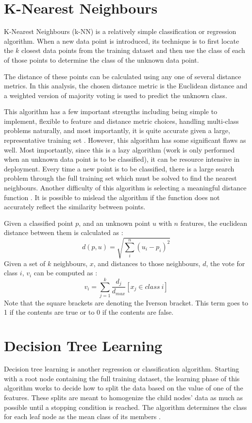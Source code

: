 \section{K-Nearest Neighbours}
K-Nearest Neighbours (k-NN) is a relatively simple classification or regression algorithm. When a new data point is introduced, its technique is to first locate the $k$ closest data points from the training dataset and then use the class of each of those points to determine the class of the unknown data point.

The distance of these points can be calculated using any one of several distance metrics. In this analysis, the chosen distance metric is the Euclidean distance and a weighted version of majority voting is used to predict the unknown class.

This algorithm has a few important strengths including being simple to implement, flexible to feature and distance metric choices, handling multi-class problems naturally, and most importantly, it is quite accurate given a large, representative training set \cite{KNN}. However, this algorithm has some significant flaws as well. Most importantly, since this is a lazy algorithm (work is only performed when an unknown data point is to be classified), it can be resource intensive in deployment. Every time a new point is to be classified, there is a large search problem through the full training set which must be solved to find the nearest neighbours. Another difficulty of this algorithm is selecting a meaningful distance function \cite{KNN}. It is possible to mislead the algorithm if the function does not accurately reflect the similarity between points.

Given a classified point $p$, and an unknown point $u$ with $n$ features, the euclidean distance between them is calculated as \cite{KNN}: 
$$d(p, u) = \sqrt{\sum\limits_i^n(u_i - p_i)^2}$$
Given a set of $k$ neighbours, $x$, and distances to those neighbours, $d$, the vote for class $i$, $v_i$ can be computed as \cite{KNN}:
$$v_i = \sum\limits_{j=1}^{k} \frac{d_j}{d_{max}} \left[x_j \in class~i\right]$$
Note that the square brackets are denoting the Iverson bracket. This term goes to 1 if the contents are true or to 0 if the contents are false.



\section{Decision Tree Learning}
Decision tree learning is another regression or classification algorithm. Starting with a root node containing the full training dataset, the learning phase of this algorithm works to decide how to split the data based on the value of one of the features. These splits are meant to homogenize the child nodes' data as much as possible until a stopping condition is reached. The algorithm determines the class for each leaf node as the mean class of its members \cite{Gini-Index}.

